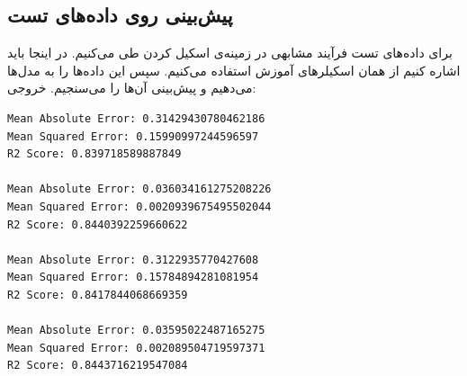 \documentclass[11pt, a4paper, oneside]{book}
\begin{document}
\subsection{پیش‌بینی روی داده‌های تست}
برای داده‌های تست فرآیند مشابهی در زمینه‌ی اسکیل کردن طی می‌کنیم. در اینجا باید اشاره کنیم از همان اسکیلرهای آموزش استفاده می‌کنیم. سپس این داده‌ها را به مدل‌ها می‌دهیم و پیش‌بینی آن‌ها را می‌سنجیم. خروجی:
\par

\begin{LTR}
	\begin{verbatim}
Mean Absolute Error: 0.31429430780462186
Mean Squared Error: 0.15990997244596597
R2 Score: 0.839718589887849

Mean Absolute Error: 0.036034161275208226
Mean Squared Error: 0.0020939675495502044
R2 Score: 0.8440392259660622

Mean Absolute Error: 0.3122935770427608
Mean Squared Error: 0.15784894281081954
R2 Score: 0.8417844068669359

Mean Absolute Error: 0.03595022487165275
Mean Squared Error: 0.002089504719597371
R2 Score: 0.8443716219547084
	\end{verbatim}
\end{LTR}
\end{document}

